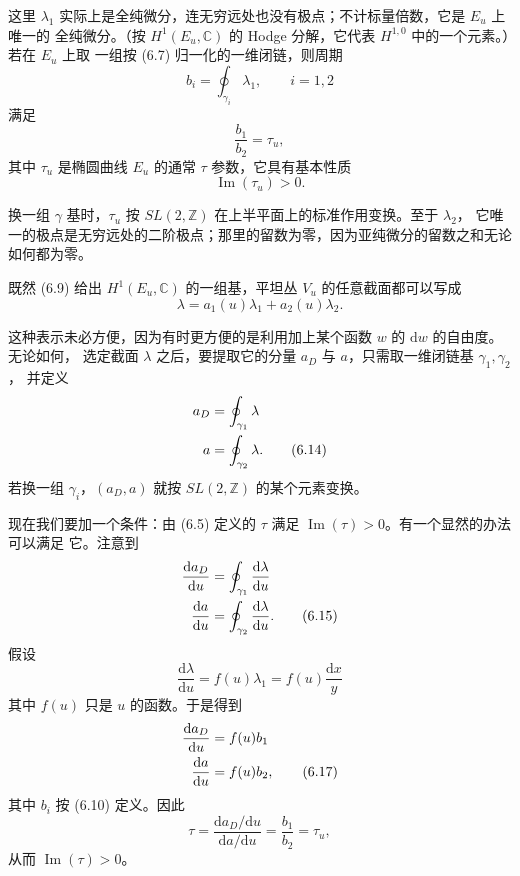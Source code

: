\documentclass[11pt,a4paper,UTF8,fontset=fandol]{ctexart}
\theoremstyle{plain}
\theoremstyle{definition}
\newcommand{\C}{\mathbb{C}}
\newcommand{\Z}{\mathbb{Z}}
\newcommand{\dd}{\mathrm{d}}
\renewcommand{\Im}{\operatorname{Im}}
\begin{document}
这里 $\lambda_1$ 实际上是全纯微分，连无穷远处也没有极点；不计标量倍数，它是 $E_u$ 上唯一的
全纯微分。（按 $H^1(E_u,\C)$ 的 Hodge 分解，它代表 $H^{1,0}$ 中的一个元素。）若在 $E_u$ 上取
一组按 (6.7) 归一化的一维闭链，则周期
\begin{equation}
  b_i=\oint_{\gamma_i}\lambda_1,\qquad i=1,2 \tag{6.10}
\end{equation}
满足
\begin{equation}
  \frac{b_1}{b_2}=\tau_u, \tag{6.11}
\end{equation}
其中 $\tau_u$ 是椭圆曲线 $E_u$ 的通常 $\tau$ 参数，它具有基本性质
\begin{equation}
  \Im(\tau_u)>0. \tag{6.12}
\end{equation}

换一组 $\gamma$ 基时，$\tau_u$ 按 $SL(2,\Z)$ 在上半平面上的标准作用变换。至于 $\lambda_2$，
它唯一的极点是无穷远处的二阶极点；那里的留数为零，因为亚纯微分的留数之和无论如何都为零。

既然 (6.9) 给出 $H^1(E_u,\C)$ 的一组基，平坦丛 $V_u$ 的任意截面都可以写成
\begin{equation}
  \lambda=a_1(u)\lambda_1+a_2(u)\lambda_2. \tag{6.13}
\end{equation}

这种表示未必方便，因为有时更方便的是利用加上某个函数 $w$ 的 $\dd w$ 的自由度。无论如何，
选定截面 $\lambda$ 之后，要提取它的分量 $a_D$ 与 $a$，只需取一维闭链基 $\gamma_1,\gamma_2$，
并定义
\begin{align}
  a_D&=\oint_{\gamma_1}\lambda\notag\\
  a&=\oint_{\gamma_2}\lambda. \tag{6.14}
\end{align}
若换一组 $\gamma_i$，$(a_D,a)$ 就按 $SL(2,\Z)$ 的某个元素变换。

现在我们要加一个条件：由 (6.5) 定义的 $\tau$ 满足 $\Im(\tau)>0$。有一个显然的办法可以满足
它。注意到
\begin{align}
  \frac{\dd a_D}{\dd u}&=\oint_{\gamma_1}\frac{\dd\lambda}{\dd u}\notag\\
  \frac{\dd a}{\dd u}&=\oint_{\gamma_2}\frac{\dd\lambda}{\dd u}. \tag{6.15}
\end{align}
假设
\begin{equation}
  \frac{\dd\lambda}{\dd u}=f(u)\lambda_1=f(u)\frac{\dd x}{y} \tag{6.16}
\end{equation}
其中 $f(u)$ 只是 $u$ 的函数。于是得到
\begin{align}
  \frac{\dd a_D}{\dd u}&=f(u)b_1\notag\\
  \frac{\dd a}{\dd u}&=f(u)b_2, \tag{6.17}
\end{align}
其中 $b_i$ 按 (6.10) 定义。因此
\begin{equation}
  \tau=\frac{\dd a_D/\dd u}{\dd a/\dd u}=\frac{b_1}{b_2}=\tau_u, \tag{6.18}
\end{equation}
从而 $\Im(\tau)>0$。
\end{document}

